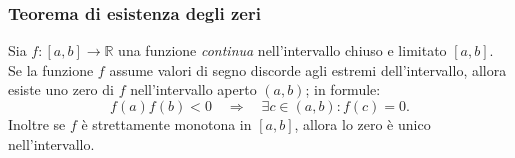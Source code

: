 \documentclass[x11names]{article}
\begin{document}
\begin{center}
\colorbox{myred}{\begin{minipage}{5.75in}
\begin{redes}{}
\subsubsection{Teorema di esistenza degli zeri}
Sia $f:\left[a,b\right] \rightarrow \mathbb{R}$ una funzione \textit{continua} nell'intervallo chiuso e limitato $\left[a,b\right]$. Se la funzione $f$ assume valori di segno discorde agli estremi dell'intervallo, allora esiste uno zero  di $f$ nell'intervallo aperto $\left(a,b\right)$; in formule:
\[
	f\left(a\right)f\left(b\right) < 0 \quad \Rightarrow \quad \exists c \in \left(a,b\right) : f\left(c\right) = 0
.\] 
Inoltre se $f$ è strettamente monotona in $\left[a,b\right]$, allora lo zero è unico nell'intervallo.
\vspace{3cm}
\begin{center}

\end{center}
\end{redes}
\end{minipage}}        
\end{center}
\end{document}
